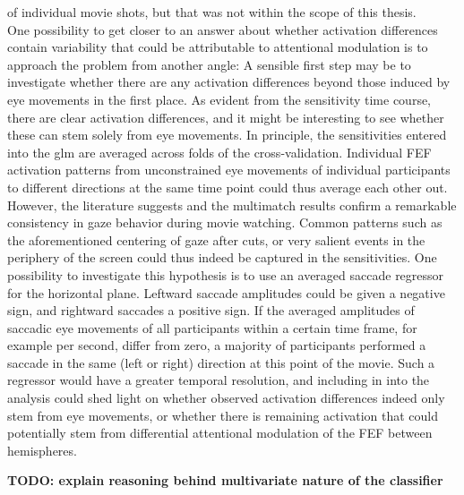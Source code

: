 \documentclass[a4paper, 12pt]{scrreprt}
\begin{document}
of individual movie shots, but that was not within the scope of this thesis. \\
One possibility to get closer to an answer about whether activation differences contain variability that could be attributable to attentional modulation is to approach the problem from another angle: A sensible first step may be to investigate whether there are any activation differences beyond those induced by eye movements in the first place. As evident from the sensitivity time course, there are clear activation differences, and it might be interesting to see whether these can stem solely from eye movements. In principle, the sensitivities entered into the glm are averaged across folds of the cross-validation. Individual FEF activation patterns from unconstrained eye movements of individual participants to different directions at the same time point could thus average each other out. However, the literature suggests and the multimatch results confirm a remarkable consistency in gaze behavior during movie watching. Common patterns such as the aforementioned centering of gaze after cuts, or very salient events in the periphery of the screen could thus indeed be captured in the sensitivities. One possibility to investigate this hypothesis is to use an averaged saccade regressor for the horizontal plane. Leftward saccade amplitudes could be given a negative sign, and rightward saccades a positive sign. If the averaged amplitudes of saccadic eye movements of all participants within a certain time frame, for example per second, differ from zero, a majority of participants performed a saccade in the same (left or right) direction at this point of the movie. Such a regressor would have a greater temporal resolution, and including in into the analysis could shed light on whether observed activation differences indeed only stem from eye movements, or whether there is remaining activation that could potentially stem from differential attentional modulation of the FEF between hemispheres.

\bigskip 

\textbf{TODO: explain reasoning behind multivariate nature of the classifier}
\end{document}

